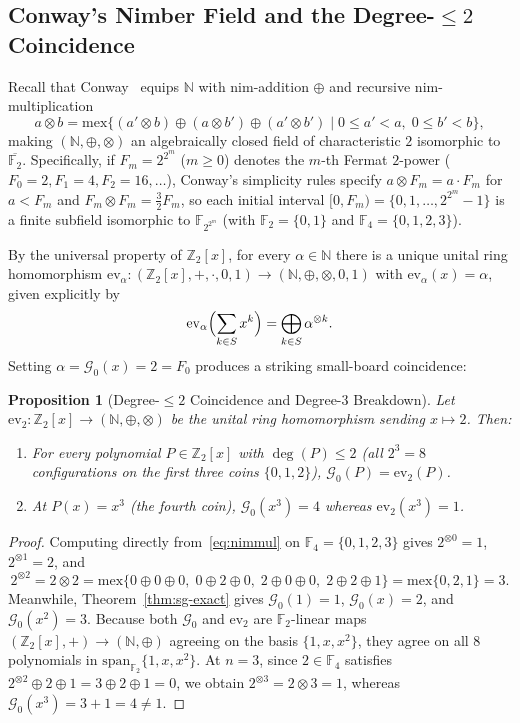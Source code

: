 \documentclass[11pt,a4paper]{article}
\newtheorem{proposition}[theorem]{Proposition}
\theoremstyle{definition}
\newcommand{\F}{\mathbb{F}}
\newcommand{\Z}{\mathbb{Z}}
\newcommand{\N}{\mathbb{N}}
\newcommand{\SG}{\mathcal{G}}
\newcommand{\mex}{\mathrm{mex}}
\newcommand{\ev}{\mathrm{ev}}
\begin{document}
\subsection{Conway's Nimber Field and the Degree-$\le 2$ Coincidence}

Recall that Conway~\cite{ONAG,WW} equips $\N$ with nim-addition $\oplus$ and recursive
nim-multiplication
\begin{equation}
\label{eq:nimmul}
  a \otimes b = \mex\bigl\{(a' \otimes b) \oplus (a \otimes b') \oplus (a' \otimes b')
  \;\big|\; 0 \le a' < a,\; 0 \le b' < b\bigr\},
\end{equation}
making $(\N,\oplus,\otimes)$ an algebraically closed field of characteristic $2$
isomorphic to $\overline{\F_2}$. Specifically, if $F_m = 2^{2^m}$ ($m \ge 0$) denotes the
$m$-th Fermat $2$-power ($F_0 = 2, F_1 = 4, F_2 = 16, \dots$), Conway's simplicity rules
specify $a \otimes F_m = a \cdot F_m$ for $a < F_m$ and
$F_m \otimes F_m = \frac{3}{2} F_m$, so each initial interval
$[0, F_m) = \{0,1,\dots,2^{2^m}-1\}$ is a finite subfield isomorphic to $\F_{2^{2^m}}$
(with $\F_2 = \{0,1\}$ and $\F_4 = \{0,1,2,3\}$).

By the universal property of $\Z_2[x]$, for every $\alpha \in \N$ there is a unique unital
ring homomorphism $\ev_\alpha : (\Z_2[x],+,\cdot,0,1) \to (\N,\oplus,\otimes,0,1)$ with
$\ev_\alpha(x) = \alpha$, given explicitly by
\[
  \ev_\alpha\Bigl(\sum_{k \in S} x^k\Bigr) = \bigoplus_{k \in S} \alpha^{\otimes k}.
\]
Setting $\alpha = \SG_0(x) = 2 = F_0$ produces a striking small-board coincidence:

\begin{proposition}[Degree-$\le 2$ Coincidence and Degree-$3$ Breakdown]
\label{prop:coincidence}
Let $\ev_2 : \Z_2[x] \to (\N,\oplus,\otimes)$ be the unital ring homomorphism sending
$x \mapsto 2$. Then:
\begin{enumerate}
  \setlength{\itemsep}{2pt}
  \item For \emph{every} polynomial $P \in \Z_2[x]$ with $\deg(P) \le 2$ (all $2^3 = 8$
    configurations on the first three coins $\{0,1,2\}$), $\SG_0(P) = \ev_2(P)$.
  \item At $P(x) = x^3$ (the fourth coin), $\SG_0(x^3) = 4$ whereas $\ev_2(x^3) = 1$.
\end{enumerate}
\end{proposition}

\begin{proof}
Computing directly from~\eqref{eq:nimmul} on $\F_4 = \{0,1,2,3\}$ gives $2^{\otimes 0} = 1$,
$2^{\otimes 1} = 2$, and
\[
  2^{\otimes 2} = 2 \otimes 2
  = \mex\{0 \oplus 0 \oplus 0,\; 0 \oplus 2 \oplus 0,\; 2 \oplus 0 \oplus 0,\;
          2 \oplus 2 \oplus 1\}
  = \mex\{0,2,1\} = 3.
\]
Meanwhile, Theorem~\ref{thm:sg-exact} gives $\SG_0(1) = 1$, $\SG_0(x) = 2$, and
$\SG_0(x^2) = 3$. Because both $\SG_0$ and $\ev_2$ are $\F_2$-linear maps
$(\Z_2[x],+) \to (\N,\oplus)$ agreeing on the basis $\{1,x,x^2\}$, they agree on all $8$
polynomials in $\mathrm{span}_{\F_2}\{1,x,x^2\}$. At $n = 3$, since $2 \in \F_4$ satisfies
$2^{\otimes 2} \oplus 2 \oplus 1 = 3 \oplus 2 \oplus 1 = 0$, we obtain
$2^{\otimes 3} = 2 \otimes 3 = 1$, whereas $\SG_0(x^3) = 3 + 1 = 4 \neq 1$.
\end{proof}
\end{document}
